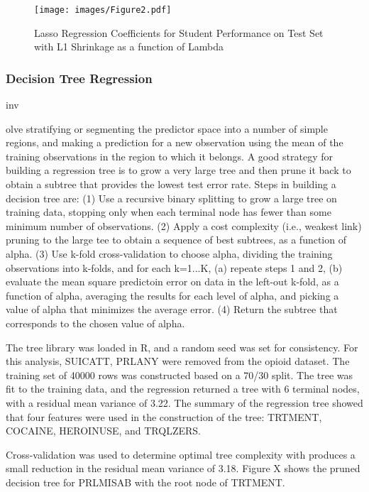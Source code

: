 \documentclass[sigconf]{acmart}
\begin{document}
\begin{figure}[!ht]
  \centering\texttt{[image: images/Figure2.pdf]}
  \caption{Lasso Regression Coefficients for Student Performance on Test Set 
  with L1 Shrinkage as a function of Lambda}
  \label{f:Figure2}
\end{figure}




\subsubsection{Decision Tree Regression} inv

olve stratifying or segmenting the
predictor space into a number of simple regions, and making a prediction for 
a new observation using the mean of the training observations in the region 
to which it belongs. A good strategy for building a regression tree is to
grow a very large tree and then prune it back to obtain a subtree that
provides the lowest test error rate. Steps in building a decision tree are:
(1) Use a recursive binary splitting to grow a large tree on training data, 
stopping only when each terminal node has fewer than some minimum number of 
observations. (2) Apply a cost complexity (i.e., weakest link) pruning  to 
the large tee to obtain a sequence of best subtrees, as a function of alpha. 
(3) Use k-fold cross-validation to choose alpha, dividing the training 
observations into k-folds, and for each k=1...K, (a) repeate steps 1 and 2,
(b) evaluate the mean square predictoin error on data in the left-out k-fold,
as a function of alpha, averaging the results for each level of alpha, and 
picking a value of alpha that minimizes the average error. (4) Return the 
subtree that corresponds to the chosen value of alpha. 

The tree library was loaded in R, and a random seed was set for consistency. 
For this analysis, SUICATT, PRLANY were removed from the opioid dataset. The 
training set of 40000 rows was constructed based on a 70/30 split. The tree
was fit to the training data, and the regression returned a tree with 6
terminal nodes, with a residual mean variance of 3.22. The summary of the 
regression tree showed that four features were used in the construction of 
the tree: TRTMENT, COCAINE, HEROINUSE, and TRQLZERS. 

Cross-validation 
was used to determine optimal tree complexity with produces a small reduction
in the residual mean variance of 3.18. Figure X shows the pruned decision tree 
for PRLMISAB with the root node of TRTMENT. 
\end{document}
